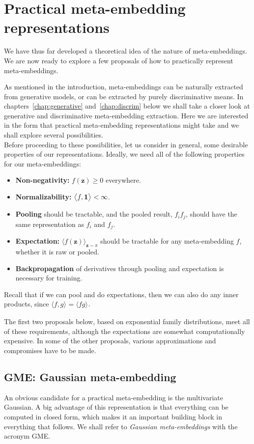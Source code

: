\documentclass[a4paper,oneside,12pt,english]{report}
\def\zvec{\mathbf{z}}
\def\expv#1#2{\bigl\langle#1\bigr\rangle_{#2}}
\def\dot#1#2{\expv{#1,#2}{}}
\begin{document}
\chapter{Practical meta-embedding representations}
\label{chap:representations}
We have thus far developed a theoretical idea of the nature of meta-embeddings. We are now ready to explore a few proposals of how to practically represent meta-embeddings. 

As mentioned in the introduction, meta-embeddings can be naturally extracted from generative models, or can be extracted by purely discriminative means. In chapters~\ref{chap:generative} and~\ref{chap:discrim} below we shall take a closer look at generative and discriminative meta-embedding extraction. Here we are interested in the form that practical meta-embedding representations might take and we shall explore several possibilities. \\

\noindent Before proceeding to these possibilities, let us consider in general, some desirable properties of our representations. Ideally, we need all of the following properties for our meta-embeddings:
\begin{itemize}
	\item[] \textbf{Non-negativity:} $f(\zvec)\ge0$ everywhere.
	\item[] \textbf{Normalizability:} $\dot{f}{\onevec}<\infty$.
	\item[] \textbf{Pooling} should be tractable, and the pooled result, $f_if_j$, should have the same representation as $f_i$ and $f_j$.
	\item[] \textbf{Expectation:}  $\expv{f(\zvec)}{\zvec\sim\pi}$ should be tractable for any meta-embedding $f$, whether it is raw or pooled.
	\item[] \textbf{Backpropagation} of derivatives through pooling and expectation is necessary for training.
\end{itemize}
Recall that if we can pool and do expectations, then we can also do any inner products, since $\dot{f}{g}=\expv{fg}{}$.

The first two proposals below, based on exponential family distributions, meet all of these requirements, although the expectations are somewhat computationally expensive. In some of the other proposals, various approximations and compromises have to be made.



\section{GME: Gaussian meta-embedding}
\label{sec:MVG}
\def\dvec{\mathbf{d}}
An obvious candidate for a practical meta-embedding is the multivariate Gaussian. A big advantage of this representation is that everything can be computed in closed form, which makes it an important building block in everything that follows. We shall refer to \emph{Gaussian meta-embeddings} with the acronym GME.
\end{document}
